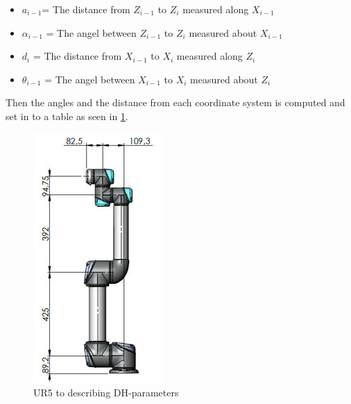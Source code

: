 \begin{itemize}
    \item ${a_{i-1}}$= The distance from ${Z_{i-1}}$ to ${Z_{i}}$ measured along ${X_{i-1}}$
    \item ${\alpha_{i-1}}$ = The angel between ${Z_{i-1}}$ to ${Z_{i}}$ measured about ${X_{i-1}}$
    \item ${d_{i}}$ = The distance from ${X_{i-1}}$ to ${X_{i}}$ measured along ${Z_{i}}$
    \item ${\theta_{i-1}}$ = The angel between ${X_{i-1}}$ to ${X_{i}}$ measured about ${Z_{i}}$
\end{itemize}




Then the angles and the distance from each coordinate system is computed and set in to a table as seen in \ref{fig:DH-Table}.

\begin{figure}[h!]
    \centering
    \includegraphics[scale=0.79]{Design/UR5measure.png}
    \caption{UR5 to describing DH-parameters \cite{DH}} 
    \label{fig:DH-Table} 
\end{figure}


